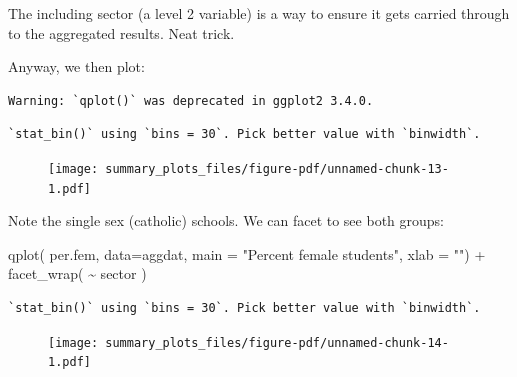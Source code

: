 \documentclass[
  letterpaper,
  DIV=11,
  numbers=noendperiod]{scrreprt}
\newenvironment{Shaded}{\begin{snugshade}}{\end{snugshade}}
\newcommand{\AttributeTok}[1]{\textcolor[rgb]{0.49,0.56,0.16}{#1}}
\newcommand{\FunctionTok}[1]{\textcolor[rgb]{0.02,0.16,0.49}{#1}}
\newcommand{\NormalTok}[1]{\textcolor[rgb]{0.00,0.44,0.13}{#1}}
\newcommand{\SpecialCharTok}[1]{\textcolor[rgb]{0.25,0.44,0.63}{#1}}
\newcommand{\StringTok}[1]{\textcolor[rgb]{0.25,0.44,0.63}{#1}}
\begin{document}
The including sector (a level 2 variable) is a way to ensure it gets
carried through to the aggregated results. Neat trick.

Anyway, we then plot:

\begin{Shaded}
\end{Shaded}

\begin{verbatim}
Warning: `qplot()` was deprecated in ggplot2 3.4.0.
\end{verbatim}

\begin{verbatim}
`stat_bin()` using `bins = 30`. Pick better value with `binwidth`.
\end{verbatim}

\begin{figure}[H]

{\centering \texttt{[image: summary\_plots\_files/figure-pdf/unnamed-chunk-13-1.pdf]}

}

\end{figure}

Note the single sex (catholic) schools. We can facet to see both groups:

\begin{Shaded}
\begin{Highlighting}[]
\FunctionTok{qplot}\NormalTok{( per.fem, }\AttributeTok{data=}\NormalTok{aggdat,}
       \AttributeTok{main =} \StringTok{"Percent female students"}\NormalTok{, }
       \AttributeTok{xlab =} \StringTok{""}\NormalTok{) }\SpecialCharTok{+}
  \FunctionTok{facet\_wrap}\NormalTok{( }\SpecialCharTok{\textasciitilde{}}\NormalTok{ sector )}
\end{Highlighting}
\end{Shaded}

\begin{verbatim}
`stat_bin()` using `bins = 30`. Pick better value with `binwidth`.
\end{verbatim}

\begin{figure}[H]

{\centering \texttt{[image: summary\_plots\_files/figure-pdf/unnamed-chunk-14-1.pdf]}

}

\end{figure}
\end{document}
